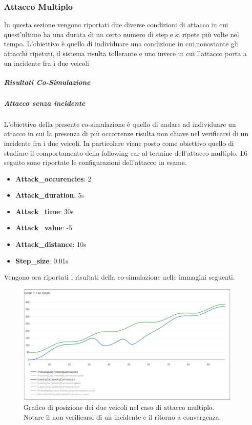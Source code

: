 \subsubsection{Attacco Multiplo}
In questa sezione vengono riportati due diverse condizioni di attacco in cui quest'ultimo ha una durata di un certo numero di step e si ripete più volte nel tempo. L'obiettivo è quello di individuare una condizione in cui,nonostante gli attacchi ripetuti, il sistema risulta tollerante e uno invece in cui l'attacco porta a un incidente fra i due veicoli
\subparagraph{Risultati Co-Simulazione}
\subparagraph{Attacco senza incidente}
L'obiettivo della presente co-simulazione è quello di andare ad individuare un attacco in cui la presenza di più occorrenze risulta non chiave nel verificarsi di un incidente fra i due veicoli. In particolare viene posto come obiettivo quello di studiare il comportamento della following car al termine dell'attacco multiplo. Di seguito sono riportate le configurazioni dell'attacco in esame.
\begin{itemize}
	\item \textbf{Attack\_occurencies}: 2
	\item \textbf{Attack\_duration}: 5s
	\item \textbf{Attack\_time}: 30s
	\item \textbf{Attack\_value}: -5
	\item \textbf{Attack\_distance}: 10s
	\item \textbf{Step\_size}: 0.01s
\end{itemize}
Vengono ora riportati i risultati della co-simulazione nelle immagini seguenti.

\begin{figure}[H]
	\centering
	\includegraphics[width=\textwidth]{img/MultiAttackAccelPlotXNoCrash.png}
	\caption{Grafico di posizione dei due veicoli nel caso di attacco multiplo. Notare il non verificarsi di un incidente e il ritorno a convergenza.}
\end{figure}

